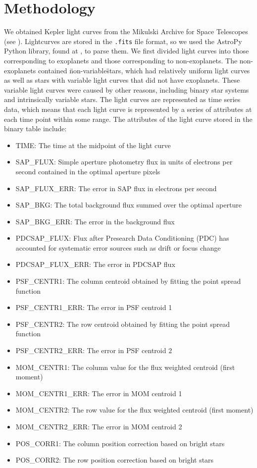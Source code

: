 \documentclass{amsart}
\begin{document}
\section{Methodology}
We obtained Kepler light curves from the Mikulski Archive for Space Telescopes (see \cite{mast}). Lightcurves are stored in the \texttt{.fits} file format, so we used the AstroPy Python library, found at \cite{AstroPy}, to parse them. We first divided light curves into those corresponding to exoplanets and those corresponding to non-exoplanets. The non-exoplanets contained \"non-variable\" stars, which had relatively uniform light curves as well as stars with variable light curves that did not have exoplanets. These variable light curves were caused by other reasons, including binary star systems and intrinsically variable stars. The light curves are represented as time series data, which means that each light curve is represented by a series of attributes at each time point within some range. The attributes of the light curve stored in the binary table include:
\begin{itemize}
	\item TIME: The time at the midpoint of the light curve
	\item SAP\_FLUX: Simple aperture photometry flux in units of electrons per second contained in the optimal aperture pixels
	\item SAP\_FLUX\_ERR: The error in SAP flux in electrons per second
	\item SAP\_BKG: The total background flux summed over the optimal aperture
	\item SAP\_BKG\_ERR: The error in the background flux
	\item PDCSAP\_FLUX: Flux after Presearch Data Conditioning (PDC) has accounted for systematic error sources such as drift or focus change
	\item PDCSAP\_FLUX\_ERR: The error in PDCSAP flux
	\item PSF\_CENTR1: The column centroid obtained by fitting the point spread function
	\item PSF\_CENTR1\_ERR: The error in PSF centroid 1
	\item PSF\_CENTR2: The row centroid obtained by fitting the point spread function
	\item PSF\_CENTR2\_ERR: The error in PSF centroid 2
	\item MOM\_CENTR1: The column value for the flux weighted centroid (first moment)
	\item MOM\_CENTR1\_ERR: The error in MOM centroid 1
	\item MOM\_CENTR2: The row value for the flux weighted centroid (first moment)
	\item MOM\_CENTR2\_ERR: The error in MOM centroid 2
	\item POS\_CORR1: The column position correction based on bright stars 
	\item POS\_CORR2: The row position correction based on bright stars
\end{itemize}
\end{document}

